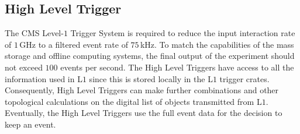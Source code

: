 \subsection{High Level Trigger}
The CMS Level-$1$ Trigger System is required to reduce the input interaction rate of $1 \,$GHz to a filtered event rate of $75 \,$kHz. To match the capabilities of the mass storage and offline computing systems, the final output of the experiment should not exceed $100$ events per second. The High Level Triggers have access to all the information used in L$1$ since this is stored locally in the L$1$ trigger crates. Consequently, High Level Triggers can make further combinations and other topological calculations on the digital list of objects transmitted from L$1$. Eventually, the High Level Triggers use the full event data for the decision to keep an event.



